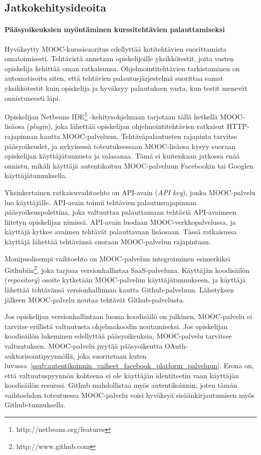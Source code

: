\documentclass[finnish,gradu]{tktltiki}
\begin{document}
  \newpage
  \subsection{Jatkokehitysideoita} %
  \label{sub:jatkokehitysideoita}

  \paragraph{Pääsyoikeuksien myöntäminen kurssitehtävien palauttamiseksi} \hfill %
  \label{par:pääsyoikeuksien_myöntäminen_ohjelmakoodin_palauttamiseksi}

    Hyväksytty MOOC-kurssisuoritus edellyttää kotitehtävien suorittamista omatoimisesti. Tehtävistä annetaan opiskelijoille yksikkötestit, joita vasten opiskelija kehittää oman ratkaisunsa. Ohjelmointitehtävien tarkistaminen on automatisoitu siten, että tehtävien palautusjärjestelmä suorittaa samat yksikkötestit kuin opiskelija ja hyväksyy palautuksen vasta, kun testit menevät onnistuneesti läpi.

    Opiskelijan Netbeans IDE\footnote{http://netbeans.org/features} -kehitysohjelmaan tarjotaan tällä hetkellä MOOC-lisäosa (\emph{plugin}), joka lähettää opiskelijan ohjelmointitehtävien ratkaisut HTTP-rajapinnan kautta MOOC-palveluun. Tehtäväpalautusten rajapinta tarvitse pääsyoikeudet, ja nykyisessä toteutuksessaan MOOC-lisäosa kysyy suoraan opiskelijan käyttäjätunnusta ja salasanaa. Tämä ei kuitenkaan jatkossa enää onnistu, mikäli käyttäjä autentikoituu MOOC-palveluun Facebookin tai Googlen käyttäjätunnuksella.

    Yksinkertainen ratkaisuvaihtoehto on API-avain (\emph{API key}), jonka MOOC-palvelu luo käyttäjälle. API-avain toimii tehtävien palautusrajapinnan pääsyoikeuspolettina, joka valtuuttaa palauttamaan tehtäviä API-avaimeen liitetyn opiskelijan nimissä. API-avain luodaan MOOC-verkkopalvelussa, ja käyttäjä kytkee avaimen tehtävät palauttavaan lisäosaan. Tässä ratkaisussa käyttäjä lähettää tehtävänsä suoraan MOOC-palvelun rajapintaan.

    Monipuolisempi vaihtoehto on MOOC-palvelun integroiminen esimerkiksi Githubiin\footnote{http://www.github.com}, joka tarjoaa versionhallintaa SaaS-palveluna. Käyttäjän koodisäilön (\emph{repository}) osoite kytketään MOOC-palvelun käyttäjätunnukseen, ja käyttäjä lähettää tehtävänsä versionhallinnan kautta Github-palveluun. Lähetyksen jälkeen MOOC-palvelu noutaa tehtävät Github-palvelusta.

    Jos opiskelijan versionhallintaan luoma koodisäilö on julkinen, MOOC-palvelu ei tarvitse erillistä valtuutusta ohjelmakoodin noutamiseksi. Jos opiskelijan koodisäilön lukeminen edellyttää pääsyoikeuksia, MOOC-palvelu tarvitsee valtuutuksen. MOOC-palvelu pyytää pääsyoikeutta OAuth-auktorisointipyynnöllä, joka suoritetaan kuten luvussa~\ref{ssub:autentikoinnin_vaiheet_facebook_platform_palveluun}. Erona on, että valtuutuspyynnön kohteena ei ole käyttäjän identiteetin vaan käyttäjän koodisäilön resurssi. Github mahdollistaa myös autentikoinnin, joten tämän vaihtoehdon toteutuessa MOOC-palvelu voisi hyväksyä sisäänkirjautumisen myös Github-tunnuksella.
\end{document}
